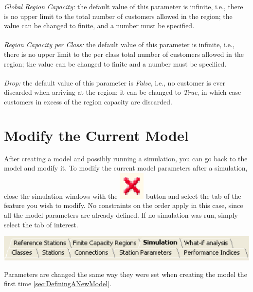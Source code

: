 \emph{Global Region Capacity: }
the default value of this parameter is infinite, i.e., there is no upper limit to the total number of customers allowed in the region; the value can be  changed to finite, and a number must be specified.\\\\
\emph{Region Capacity per Class: }
the default value of this parameter is infinite, i.e., there is no upper limit to the per class total number of customers allowed in  the region; the value can be changed to finite and a number must be specified.\\\\
\emph{Drop:}
the default value of this parameter is \emph{False}, i.e., no customer is ever discarded when arriving at the region; it can be changed to \emph{True}, in which case customers in excess of the region capacity are discarded.

\section{Modify the Current Model}
\label{sec:ModifyTheCurrentModel}
After creating a model and possibly running a simulation, you can go back to the model and modify it.
To modify the current model parameters after a simulation, close the simulation windows with the \includegraphics[scale=.5]{img/jsim/exit_simulation.eps} button and select the tab of the feature you wish to modify. No constraints on the order apply in this case, since all the model parameters are already defined. If no simulation was run, simply select the tab of interest.
\begin{center}
\includegraphics[scale=.5]{img/jsim/tabs_list_complete.eps}
\end{center}
Parameters are changed the same way they were set when creating the model the first time \autoref{sec:DefiningANewModel}.

